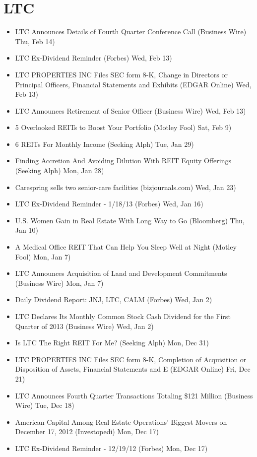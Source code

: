 \documentclass[11pt,asymmetric]{article}
\begin{document}
\section*{LTC}
\begin{itemize}
\item LTC Announces Details of Fourth Quarter Conference Call (Business Wire) Thu, Feb 14)
\item LTC Ex-Dividend Reminder (Forbes) Wed, Feb 13)
\item LTC PROPERTIES INC Files SEC form 8-K, Change in Directors or Principal Officers, Financial Statements and Exhibits (EDGAR Online) Wed, Feb 13)
\item LTC Announces Retirement of Senior Officer (Business Wire) Wed, Feb 13)
\item 5 Overlooked REITs to Boost Your Portfolio (Motley Fool) Sat, Feb 9)
\item 6 REITs For Monthly Income (Seeking Alph) Tue, Jan 29)
\item Finding Accretion And Avoiding Dilution With REIT Equity Offerings (Seeking Alph) Mon, Jan 28)
\item Carespring sells two senior-care facilities (bizjournals.com) Wed, Jan 23)
\item LTC Ex-Dividend Reminder - 1/18/13 (Forbes) Wed, Jan 16)
\item U.S. Women Gain in Real Estate With Long Way to Go (Bloomberg) Thu, Jan 10)
\item A Medical Office REIT That Can Help You Sleep Well at Night (Motley Fool) Mon, Jan 7)
\item LTC Announces Acquisition of Land and Development Commitments (Business Wire) Mon, Jan 7)
\item Daily Dividend Report: JNJ, LTC, CALM (Forbes) Wed, Jan 2)
\item LTC Declares Its Monthly Common Stock Cash Dividend for the First Quarter of 2013 (Business Wire) Wed, Jan 2)
\item Is LTC The Right REIT For Me? (Seeking Alph) Mon, Dec 31)
\item LTC PROPERTIES INC Files SEC form 8-K, Completion of Acquisition or Disposition of Assets, Financial Statements and E (EDGAR Online) Fri, Dec 21)
\item LTC Announces Fourth Quarter Transactions Totaling \$121 Million (Business Wire) Tue, Dec 18)
\item American Capital Among Real Estate Operations' Biggest Movers on December 17, 2012 (Investopedi) Mon, Dec 17)
\item LTC Ex-Dividend Reminder - 12/19/12 (Forbes) Mon, Dec 17)

\end{itemize}
\end{document}
